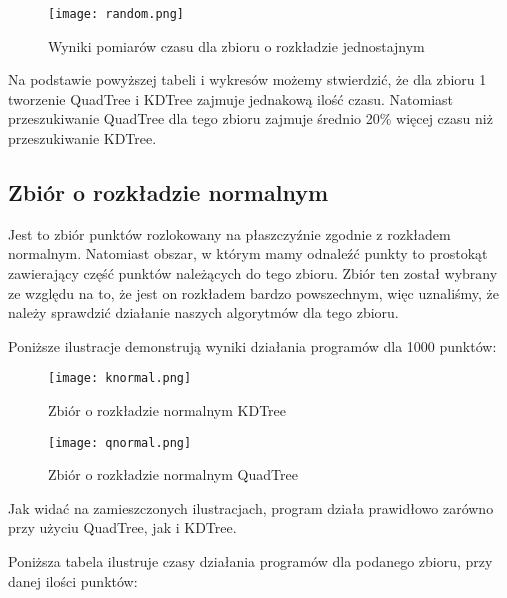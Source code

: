 \documentclass[a4paper, 12pt]{article}
\begin{document}
      \begin{figure}[h!]
      \centering
        \texttt{[image: random.png]}
        \caption{Wyniki pomiarów czasu dla zbioru o rozkładzie jednostajnym}
      \end{figure}

      \noindent
      \quad Na podstawie powyższej tabeli i wykresów możemy stwierdzić, że dla zbioru 1 tworzenie QuadTree i KDTree zajmuje jednakową ilość czasu. Natomiast przeszukiwanie QuadTree dla tego zbioru zajmuje średnio 20\% więcej czasu niż przeszukiwanie KDTree. 

    \subsection{Zbiór o rozkładzie normalnym}
      \quad Jest to zbiór punktów rozlokowany na płaszczyźnie zgodnie z rozkładem normalnym. Natomiast obszar, w którym mamy odnaleźć punkty to prostokąt zawierający część punktów należących do tego zbioru. Zbiór ten został wybrany ze względu na to, że jest on rozkładem bardzo powszechnym, więc uznaliśmy, że należy sprawdzić działanie naszych algorytmów dla tego zbioru. 

      \noindent
      \quad Poniższe ilustracje demonstrują wyniki działania programów dla 1000 punktów:

      \newpage
      \begin{figure}[h!]
      \centering
        \texttt{[image: knormal.png]}
        \caption{Zbiór o rozkładzie normalnym KDTree}
      \end{figure}

      \begin{figure}[h!]
      \centering
        \texttt{[image: qnormal.png]}
        \caption{Zbiór o rozkładzie normalnym QuadTree}
      \end{figure}

      \noindent
      \quad Jak widać na zamieszczonych ilustracjach, program działa prawidłowo zarówno przy użyciu QuadTree, jak i KDTree.

      \noindent
      \quad Poniższa tabela ilustruje czasy działania programów dla podanego zbioru, przy danej ilości punktów:
\end{document}
